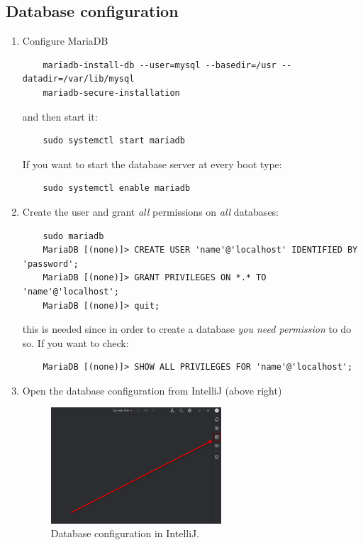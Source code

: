 \subsection{Database configuration}\label{sec: db_intellij}

\begin{enumerate}
  \item Configure MariaDB
    \begin{verbatim}
    mariadb-install-db --user=mysql --basedir=/usr --datadir=/var/lib/mysql
    mariadb-secure-installation
    \end{verbatim}
    and then start it:
    \begin{verbatim}
    sudo systemctl start mariadb
    \end{verbatim}
    If you want to start the database server at every boot type:
    \begin{verbatim}
    sudo systemctl enable mariadb
    \end{verbatim}

  \item Create the user and grant \emph{all} permissions on \emph{all} databases:
    \begin{verbatim}
    sudo mariadb
    MariaDB [(none)]> CREATE USER 'name'@'localhost' IDENTIFIED BY 'password';
    MariaDB [(none)]> GRANT PRIVILEGES ON *.* TO 'name'@'localhost';
    MariaDB [(none)]> quit;
    \end{verbatim}
    this is needed since in order to create a database \emph{you need permission} to do so. If you want to check:
    \begin{verbatim}
    MariaDB [(none)]> SHOW ALL PRIVILEGES FOR 'name'@'localhost';
    \end{verbatim}

  \item Open the database configuration from IntelliJ (above right)
    \begin{figure}[H]
      \centering
      \includegraphics[width=0.6\textwidth]{img/intellij/intellij_8.png}
      \caption{Database configuration in IntelliJ.}
    \end{figure}


\end{enumerate}
